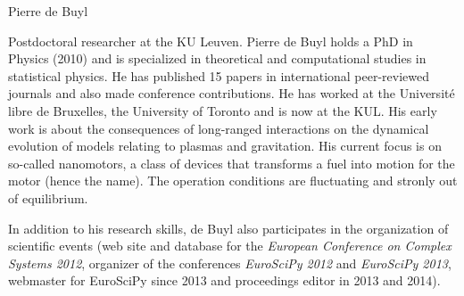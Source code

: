 \begin{participant}[type=R,PM=12,gender=male,salary=5500]{Pierre de Buyl}

Postdoctoral researcher at the KU Leuven.
Pierre de Buyl holds a PhD in Physics (2010) and is specialized in theoretical and
computational studies in statistical physics. He has published 15 papers in international
peer-reviewed journals and also made conference contributions. He has worked at the
Université libre de Bruxelles, the University of Toronto and is now at the KUL.
%
His early work is about the consequences of long-ranged interactions on the dynamical
evolution of models relating to plasmas and gravitation.
%
His current focus is on so-called nanomotors, a class of devices that transforms a fuel into
motion for the motor (hence the name). The operation conditions are fluctuating and stronly
out of equilibrium.

In addition to his research skills, de Buyl also participates in the organization of
scientific events (web site and database for the {\em European Conference on Complex Systems
  2012}, organizer of the conferences {\em EuroSciPy 2012} and {\em EuroSciPy 2013},
webmaster for EuroSciPy since 2013 and proceedings editor in 2013 and 2014).

\end{participant}
